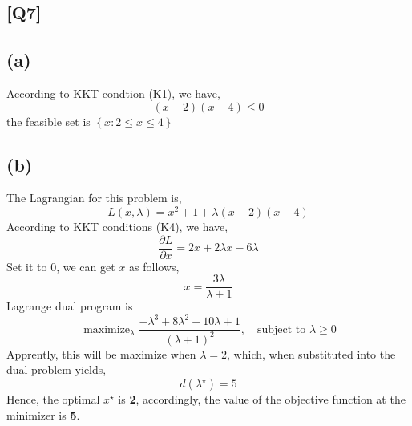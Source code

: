 \documentclass[12pt, a4 paper]{article}
\begin{document}
    \begin{framed}
        \section{[Q7]}
        \subsection{(a)}
        According to KKT condtion (K1), we have,
        \begin{equation}
            (x-2)(x-4) \leq 0
        \end{equation}
        \indent the feasible set is $ \left\{x: 2 \leq x \leq 4 \right\} $

        \subsection{(b)}
        The Lagrangian for this problem is,
        $$
            L(x, \lambda) = x^{2}+1 + \lambda (x-2)(x-4)
        $$
        \indent According to KKT conditions (K4), we have,
        $$
        \frac{\partial{L}}{\partial x} = 2x + 2\lambda x - 6\lambda
        $$
        \indent Set it to 0, we can get $x$ as follows,
        $$
        x = \frac{3\lambda}{\lambda + 1}
        $$
        \indent Lagrange dual program is
        $$
        \mathop{\text{maximize}}_{\lambda} \frac{-\lambda^{3} +
        8\lambda^{2} + 10\lambda + 1}{(\lambda+1)^{2}}, \quad
        \text{subject to } \lambda \geq 0
        $$
        \indent Apprently, this will be maximize when $\lambda=2$,
        which, when substituted into the dual problem yields,
        $$
        d(\lambda^{\star}) = 5
        $$
        \indent Hence, the optimal $x^{\star}$ is \textbf{2}, accordingly,
        the value of the objective function at the minimizer is \textbf{5}.


\end{framed}
\end{document}
